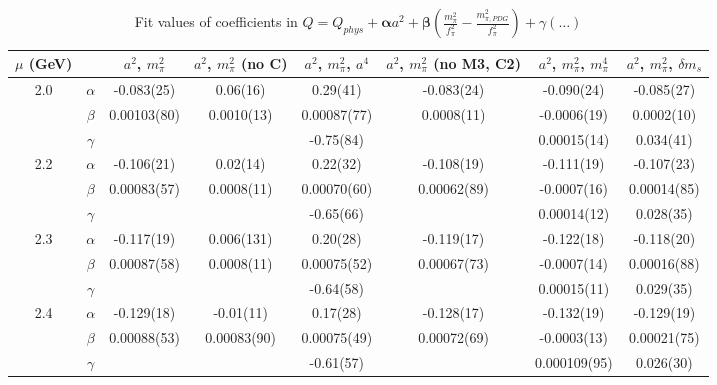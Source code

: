 \documentclass[12pt]{extarticle}
\begin{document}
\begin{table}[h!]
\begin{center}
\begin{tabular}{|c c|c|c|c|c|c|c|}
\hline
$\mu$ (GeV) &  & $a^2$, $m_\pi^2$& $a^2$, $m_\pi^2$ (no C)& $a^2$, $m_\pi^2$, $a^4$& $a^2$, $m_\pi^2$ (no M3, C2)& $a^2$, $m_\pi^2$, $m_\pi^4$& $a^2$, $m_\pi^2$, $\delta m_s$\\
\hline
\multirow{3}{0.5in}{2.0} & $\alpha$ & -0.083(25)& 0.06(16)& 0.29(41)& -0.083(24)& -0.090(24)& -0.085(27)\\
 & $\beta$ & 0.00103(80)& 0.0010(13)& 0.00087(77)& 0.0008(11)& -0.0006(19)& 0.0002(10)\\
 & $\gamma$ &  &  & -0.75(84)&  & 0.00015(14)& 0.034(41)\\
\hline
\multirow{3}{0.5in}{2.2} & $\alpha$ & -0.106(21)& 0.02(14)& 0.22(32)& -0.108(19)& -0.111(19)& -0.107(23)\\
 & $\beta$ & 0.00083(57)& 0.0008(11)& 0.00070(60)& 0.00062(89)& -0.0007(16)& 0.00014(85)\\
 & $\gamma$ &  &  & -0.65(66)&  & 0.00014(12)& 0.028(35)\\
\hline
\multirow{3}{0.5in}{2.3} & $\alpha$ & -0.117(19)& 0.006(131)& 0.20(28)& -0.119(17)& -0.122(18)& -0.118(20)\\
 & $\beta$ & 0.00087(58)& 0.0008(11)& 0.00075(52)& 0.00067(73)& -0.0007(14)& 0.00016(88)\\
 & $\gamma$ &  &  & -0.64(58)&  & 0.00015(11)& 0.029(35)\\
\hline
\multirow{3}{0.5in}{2.4} & $\alpha$ & -0.129(18)& -0.01(11)& 0.17(28)& -0.128(17)& -0.132(19)& -0.129(19)\\
 & $\beta$ & 0.00088(53)& 0.00083(90)& 0.00075(49)& 0.00072(69)& -0.0003(13)& 0.00021(75)\\
 & $\gamma$ &  &  & -0.61(57)&  & 0.000109(95)& 0.026(30)\\
\hline
\end{tabular}
\caption{Fit values of coefficients in $Q = Q_{phys} + \mathbf{\alpha} a^2 + \mathbf{\beta}\left(\frac{m_\pi^2}{f_\pi^2}-\frac{m_{\pi,PDG}^2}{f_\pi^2}\right) + \gamma(\ldots)$}
\end{center}
\end{table}






\end{document}
